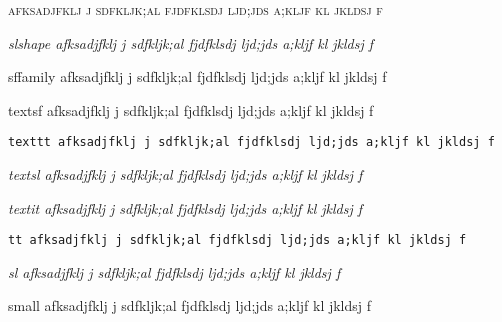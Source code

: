 \documentclass[12pt]{article}
\begin{document}
{\scshape
afksadjfklj j sdfkljk;al fjdfklsdj ljd;jds a;kljf kl jkldsj f}

{\slshape slshape
afksadjfklj j sdfkljk;al fjdfklsdj ljd;jds a;kljf kl jkldsj f}


{\sffamily sffamily
afksadjfklj j sdfkljk;al fjdfklsdj ljd;jds a;kljf kl jkldsj f}

\textsf{textsf
afksadjfklj j sdfkljk;al fjdfklsdj ljd;jds a;kljf kl jkldsj f}

\texttt{texttt
afksadjfklj j sdfkljk;al fjdfklsdj ljd;jds a;kljf kl jkldsj f}

\textsl{textsl
afksadjfklj j sdfkljk;al fjdfklsdj ljd;jds a;kljf kl jkldsj f}

\textit{textit
afksadjfklj j sdfkljk;al fjdfklsdj ljd;jds a;kljf kl jkldsj f}

{\tt tt
afksadjfklj j sdfkljk;al fjdfklsdj ljd;jds a;kljf kl jkldsj f}

{\sl sl
afksadjfklj j sdfkljk;al fjdfklsdj ljd;jds a;kljf kl jkldsj f}

{\small small
afksadjfklj j sdfkljk;al fjdfklsdj ljd;jds a;kljf kl jkldsj f}
\end{document}
